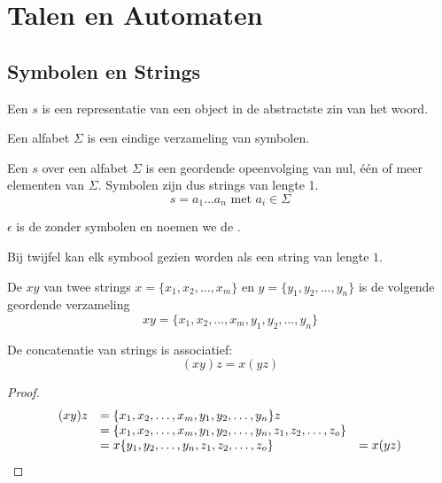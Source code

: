 \documentclass[main.tex]{subfiles}
\begin{document}
\chapter{Talen en Automaten}
\label{cha:talen-en-automaten}

\section{Symbolen en Strings}
\label{sec:symbolen-en-strings}

\begin{de}
  Een  $s$ is een representatie van een object in de abstractste zin van het woord. 
\end{de}

\begin{de}
  Een alfabet $\Sigma$ is een eindige verzameling van symbolen.
\end{de}

\begin{de}
  Een  $s$ over een alfabet $\Sigma$ is een geordende opeenvolging van nul, \'e\'en of meer elementen van $\Sigma$. Symbolen zijn dus strings van lengte 1.
  \[ s = a_{1}\ldots a_{n} \text{ met } a_{i} \in \Sigma \]
\end{de}

\begin{de}
  $\epsilon$ is de  zonder symbolen en noemen we de .
\end{de}

\begin{opm}
  Bij twijfel kan elk symbool gezien worden als een string van lengte $1$.
\end{opm}

\begin{de}
  De  $xy$ van twee strings $x = \{x_1,x_2,\ldots,x_m\}$ en $y =   \{y_1,y_2,\ldots,y_n\}$ is de volgende geordende verzameling  
  \[
  xy = \{ x_1,x_2,\ldots,x_m,y_1,y_2,\ldots,y_n\}
  \] 
\end{de}

\begin{ei}
  De concatenatie van strings is associatief:
  \[
  (xy)z = x(yz)
  \]

  \begin{proof}
    \[
    \begin{array}{r l l}
      (xy)z &= \{x_1,x_2,\ldots,x_m,y_1,y_2,\ldots,y_n\}z &\\
            &= \{x_1,x_2,\ldots,x_m,y_1,y_2,\ldots,y_n,z_1,z_2,\ldots,z_o\} &\\
            &= x\{y_1,y_2,\ldots,y_n,z_1,z_2,\ldots,z_o\} &= x(yz)
    \end{array}
    \]
  \end{proof}
\end{ei}
\end{document}
